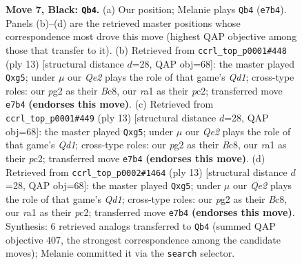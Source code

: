 \documentclass[11pt]{article}
\begin{document}
\begin{figure}[p]
\caption{\textbf{Move 7, Black: \texttt{Qb4}.} (a) Our position; Melanie plays \texttt{Qb4} (\texttt{e7b4}). Panels (b)--(d) are the retrieved master positions whose correspondence most drove this move (highest QAP objective among those that transfer to it). (b) Retrieved from \texttt{ccrl\_top\_p0001\#448} (ply 13) [structural distance $d$=28, QAP obj=68]: the master played \texttt{Qxg5}; under $\mu$ our \emph{Qe2} plays the role of that game's \emph{Qd1}; cross-type roles: our \emph{p}g2 as their \emph{B}c8, our \emph{r}a1 as their \emph{p}c2; transferred move \texttt{e7b4} \textbf{(endorses this move)}. (c) Retrieved from \texttt{ccrl\_top\_p0001\#449} (ply 13) [structural distance $d$=28, QAP obj=68]: the master played \texttt{Qxg5}; under $\mu$ our \emph{Qe2} plays the role of that game's \emph{Qd1}; cross-type roles: our \emph{p}g2 as their \emph{B}c8, our \emph{r}a1 as their \emph{p}c2; transferred move \texttt{e7b4} \textbf{(endorses this move)}. (d) Retrieved from \texttt{ccrl\_top\_p0002\#1464} (ply 13) [structural distance $d$=28, QAP obj=68]: the master played \texttt{Qxg5}; under $\mu$ our \emph{Qe2} plays the role of that game's \emph{Qd1}; cross-type roles: our \emph{p}g2 as their \emph{B}c8, our \emph{r}a1 as their \emph{p}c2; transferred move \texttt{e7b4} \textbf{(endorses this move)}. Synthesis: 6 retrieved analogs transferred to \texttt{Qb4} (summed QAP objective 407, the strongest correspondence among the candidate moves); Melanie committed it via the \texttt{search} selector.}
\label{fig:thought-m13}
\end{figure}

\clearpage
\end{document}

